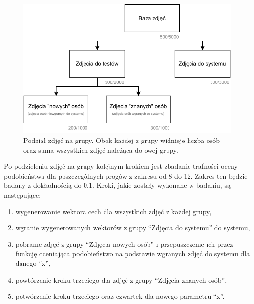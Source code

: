 \begin{figure}[H]
    \centering
    \includegraphics[width=1\textwidth]{images/podzial_zdjec}
    \caption{
        Podział zdjęć na grupy. Obok każdej z grupy widnieje liczba osób oraz suma
        wszystkich zdjęć należąca do owej grupy.
    }
    \customsource
    \label{fig:podzial_zdjec}
\end{figure}

Po podzieleniu zdjęć na grupy kolejnym krokiem jest zbadanie trafności oceny podobieństwa dla poszczególnych
progów z zakresu od \num{8} do \num{12}.
Zakres ten będzie badany z dokładnością do \num{0.1}.
Kroki, jakie zostały wykonane w badaniu, są następujące:

\begin{enumerate}
    \item wygenerowanie wektora cech dla wszystkich zdjęć z każdej grupy,
    \item wgranie wygenerowanych wektorów z grupy ``Zdjęcia do systemu'' do systemu,
    \item pobranie zdjęć z grupy ``Zdjęcia nowych osób'' i przepuszczenie ich przez
    funkcję oceniająca podobieństwo na podstawie wgranych zdjęć do systemu dla danego ``x'',
    \item powtórzenie kroku trzeciego dla zdjęć z grupy ``Zdjęcia znanych osób'',
    \item potwórzenie kroku trzeciego oraz czwartek dla nowego parametru ``x''.
\end{enumerate}

